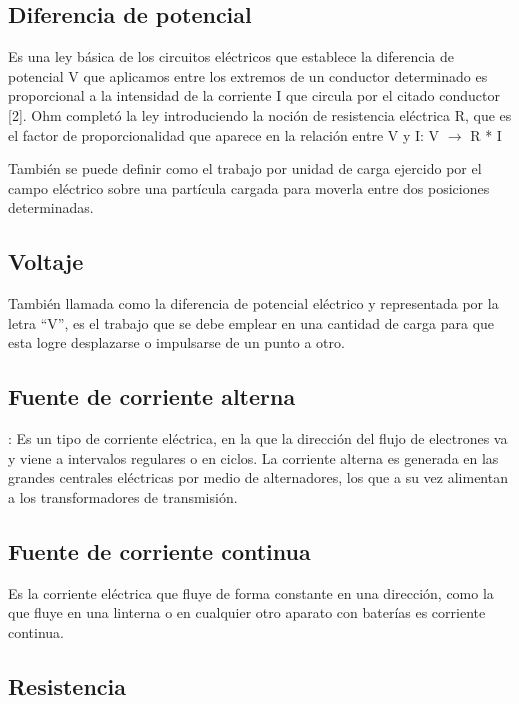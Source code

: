 \documentclass[letterpaper, 12pt]{report}
\begin{document}
\subsection{Diferencia de potencial}

Es una ley básica de los circuitos eléctricos que
establece la diferencia de potencial V que aplicamos entre los extremos de
un conductor determinado es proporcional a la intensidad de la corriente I
que circula por el citado conductor [2]. Ohm completó la ley introduciendo
la noción de resistencia eléctrica R, que es el factor de proporcionalidad
que aparece en la relación entre V y I:\@
V $\to$ R * I

\vspace{.5cm}

También se puede definir como el trabajo por unidad de carga ejercido por el
campo eléctrico sobre una partícula cargada para moverla entre dos posiciones
determinadas.

\subsection{Voltaje}

También llamada como la diferencia de potencial eléctrico y representada por
la letra ``V”, es el trabajo que se debe emplear en una cantidad de carga para
que esta logre desplazarse o impulsarse de un punto a otro.

\subsection{Fuente de corriente alterna}

: Es un tipo de corriente eléctrica, en la que la dirección del flujo
de electrones va y viene a intervalos regulares o en ciclos. La corriente
alterna es generada en las grandes centrales eléctricas por medio de
alternadores, los que a su vez alimentan a los transformadores de transmisión.
~\cite{CorrienteAlterna/Continua}

\subsection{Fuente de corriente continua}

Es la corriente eléctrica que fluye de forma constante en una dirección,
como la que fluye en una linterna o en cualquier otro aparato con baterías
es corriente continua.~\cite{CorrienteAlterna/Continua}

\subsection{Resistencia}
\end{document}
